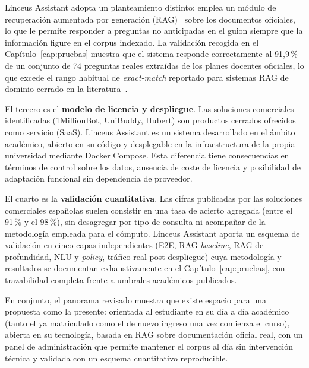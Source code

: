Linceus Assistant adopta un planteamiento distinto: emplea un módulo de recuperación aumentada por generación (RAG)~\cite{lewis2020retrieval} sobre los documentos oficiales, lo que le permite responder a preguntas no anticipadas en el guion siempre que la información figure en el corpus indexado. La validación recogida en el Capítulo~\ref{cap:pruebas} muestra que el sistema responde correctamente al 91,9\,\% de un conjunto de 74 preguntas reales extraídas de los planes docentes oficiales, lo que excede el rango habitual de \textit{exact-match} reportado para sistemas RAG de dominio cerrado en la literatura~\cite{lewis2020retrieval,es2024ragas}.

El tercero es el \textbf{modelo de licencia y despliegue}. Las soluciones comerciales identificadas (1MillionBot, UniBuddy, Hubert) son productos cerrados ofrecidos como servicio (SaaS). Linceus Assistant es un sistema desarrollado en el ámbito académico, abierto en su código y desplegable en la infraestructura de la propia universidad mediante Docker Compose. Esta diferencia tiene consecuencias en términos de control sobre los datos, ausencia de coste de licencia y posibilidad de adaptación funcional sin dependencia de proveedor.

El cuarto es la \textbf{validación cuantitativa}. Las cifras publicadas por las soluciones comerciales españolas suelen consistir en una tasa de acierto agregada (entre el 91\,\% y el 98\,\%), sin desagregar por tipo de consulta ni acompañar de la metodología empleada para el cómputo. Linceus Assistant aporta un esquema de validación en cinco capas independientes (E2E, RAG \textit{baseline}, RAG de profundidad, NLU y \textit{policy}, tráfico real post-despliegue) cuya metodología y resultados se documentan exhaustivamente en el Capítulo~\ref{cap:pruebas}, con trazabilidad completa frente a umbrales académicos publicados.

En conjunto, el panorama revisado muestra que existe espacio para una propuesta como la presente: orientada al estudiante en su día a día académico (tanto el ya matriculado como el de nuevo ingreso una vez comienza el curso), abierta en su tecnología, basada en RAG sobre documentación oficial real, con un panel de administración que permite mantener el corpus al día sin intervención técnica y validada con un esquema cuantitativo reproducible.
